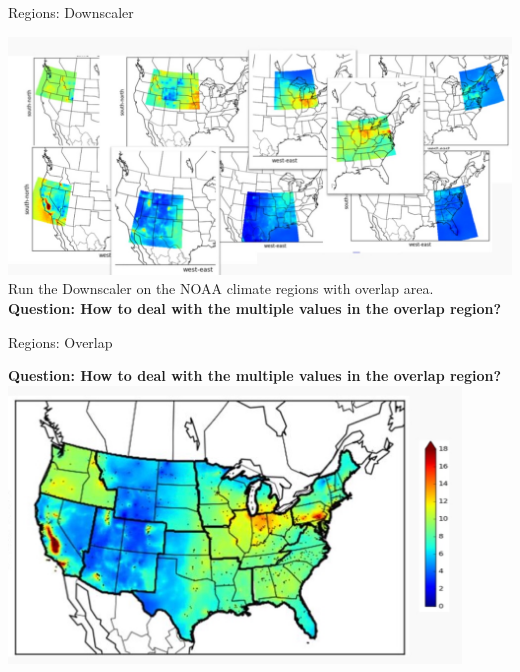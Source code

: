 \documentclass{beamer}
\begin{document}
\begin{frame}{Regions: Downscaler}
\vspace{-5mm}
\begin{center}
\includegraphics[width=1.0\textwidth]{RegionalDS.jpg}
\\
\vspace{3mm} Run the Downscaler on the NOAA climate regions with overlap area.
\\\vspace{3mm} \textbf{Question: How to deal with the multiple values in the overlap region?}
\end{center}

\end{frame}

\begin{frame}{Regions: Overlap}
\vspace{-3mm}
\begin{center}
\textbf{Question: How to deal with the multiple values in the overlap region?}
\includegraphics[width=0.9\textwidth]{patchwork.jpg}
\end{center}

\end{frame}
\end{document}
